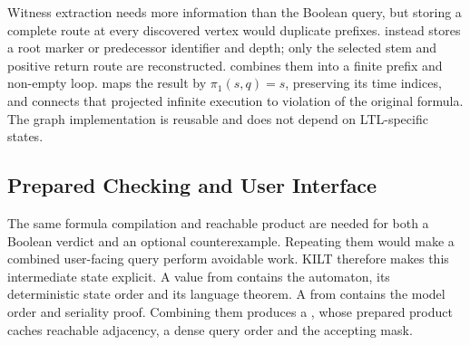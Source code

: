 Witness extraction needs more information than the Boolean query, but storing a
complete route at every discovered vertex would duplicate prefixes.
 instead stores a root marker or predecessor
identifier and depth; only the selected stem and positive return route are
reconstructed.   combines them into a finite
prefix and non-empty loop.   maps the result by
$\pi_1(s,q)=s$, preserving its time indices, and
 connects that projected infinite execution to
violation of the original formula.  The graph implementation is reusable and
does not depend on LTL-specific states.

\subsection{Prepared Checking and User Interface}

The same formula compilation and reachable product are needed for both a
Boolean verdict and an optional counterexample.  Repeating them would make a
combined user-facing query perform avoidable work.  KILT therefore makes this
intermediate state explicit.  A  value from
 contains the automaton, its deterministic state order
and its language theorem.  A  from
 contains the model order and seriality proof.
Combining them produces a , whose prepared product caches
reachable adjacency, a dense query order and the accepting mask.

